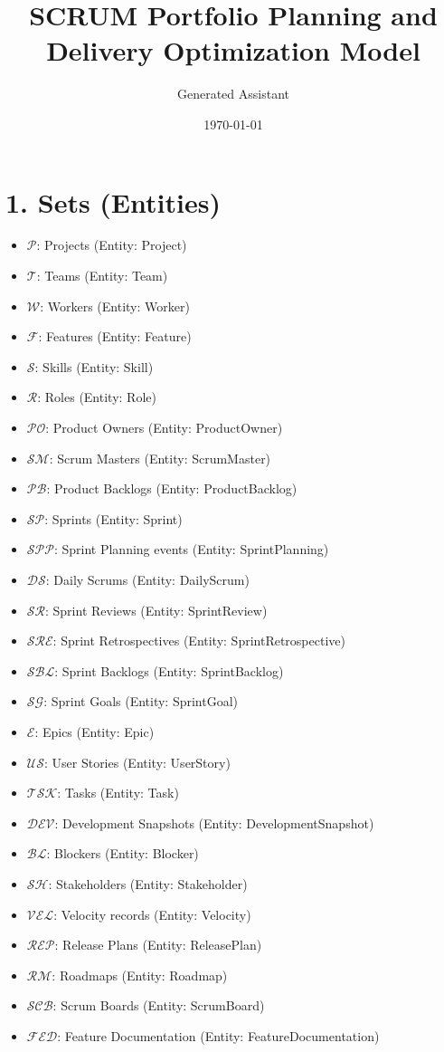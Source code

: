 \documentclass[11pt,a4paper]{article}
\title{SCRUM Portfolio Planning and Delivery Optimization Model}
\author{Generated Assistant}
\date{\today}
\begin{document}
\maketitle
\tableofcontents
\newpage

\section{1. Sets (Entities)}
\begin{itemize}[leftmargin=1.2cm]
  \item $\mathcal{P}$: Projects (Entity: Project)
  \item $\mathcal{T}$: Teams (Entity: Team)
  \item $\mathcal{W}$: Workers (Entity: Worker)
  \item $\mathcal{F}$: Features (Entity: Feature)
  \item $\mathcal{S}$: Skills (Entity: Skill)
  \item $\mathcal{R}$: Roles (Entity: Role)
  \item $\mathcal{PO}$: Product Owners (Entity: ProductOwner)
  \item $\mathcal{SM}$: Scrum Masters (Entity: ScrumMaster)
  \item $\mathcal{PB}$: Product Backlogs (Entity: ProductBacklog)
  \item $\mathcal{SP}$: Sprints (Entity: Sprint)
  \item $\mathcal{SPP}$: Sprint Planning events (Entity: SprintPlanning)
  \item $\mathcal{DS}$: Daily Scrums (Entity: DailyScrum)
  \item $\mathcal{SR}$: Sprint Reviews (Entity: SprintReview)
  \item $\mathcal{SRE}$: Sprint Retrospectives (Entity: SprintRetrospective)
  \item $\mathcal{SBL}$: Sprint Backlogs (Entity: SprintBacklog)
  \item $\mathcal{SG}$: Sprint Goals (Entity: SprintGoal)
  \item $\mathcal{E}$: Epics (Entity: Epic)
  \item $\mathcal{US}$: User Stories (Entity: UserStory)
  \item $\mathcal{TSK}$: Tasks (Entity: Task)
  \item $\mathcal{DEV}$: Development Snapshots (Entity: DevelopmentSnapshot)
  \item $\mathcal{BL}$: Blockers (Entity: Blocker)
  \item $\mathcal{SH}$: Stakeholders (Entity: Stakeholder)
  \item $\mathcal{VEL}$: Velocity records (Entity: Velocity)
  \item $\mathcal{REP}$: Release Plans (Entity: ReleasePlan)
  \item $\mathcal{RM}$: Roadmaps (Entity: Roadmap)
  \item $\mathcal{SCB}$: Scrum Boards (Entity: ScrumBoard)
  \item $\mathcal{FED}$: Feature Documentation (Entity: FeatureDocumentation)
\end{itemize}
\end{document}
